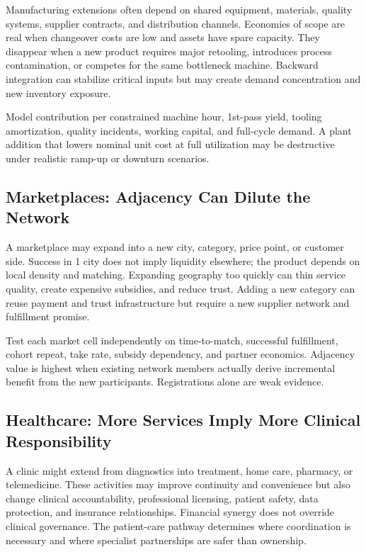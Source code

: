 Manufacturing extensions often depend on shared equipment, materials, quality systems, supplier contracts, and distribution channels. Economies of scope are real when changeover costs are low and assets have spare capacity. They disappear when a new product requires major retooling, introduces process contamination, or competes for the same bottleneck machine. Backward integration can stabilize critical inputs but may create demand concentration and new inventory exposure.

Model contribution per constrained machine hour, 1st-pass yield, tooling amortization, quality incidents, working capital, and full-cycle demand. A plant addition that lowers nominal unit cost at full utilization may be destructive under realistic ramp-up or downturn scenarios.

\subsection{Marketplaces: Adjacency Can Dilute the Network}
\label{sec:marketplaces_adjacency_dilutes_network}

A marketplace may expand into a new city, category, price point, or customer side. Success in 1 city does not imply liquidity elsewhere; the product depends on local density and matching. Expanding geography too quickly can thin service quality, create expensive subsidies, and reduce trust. Adding a new category can reuse payment and trust infrastructure but require a new supplier network and fulfillment promise.

Test each market cell independently on time-to-match, successful fulfillment, cohort repeat, take rate, subsidy dependency, and partner economics. Adjacency value is highest when existing network members actually derive incremental benefit from the new participants. Registrations alone are weak evidence.

\subsection{Healthcare: More Services Imply More Clinical Responsibility}
\label{sec:healthcare_more_services_more_responsibility}

A clinic might extend from diagnostics into treatment, home care, pharmacy, or telemedicine. These activities may improve continuity and convenience but also change clinical accountability, professional licensing, patient safety, data protection, and insurance relationships. Financial synergy does not override clinical governance. The patient-care pathway determines where coordination is necessary and where specialist partnerships are safer than ownership.

